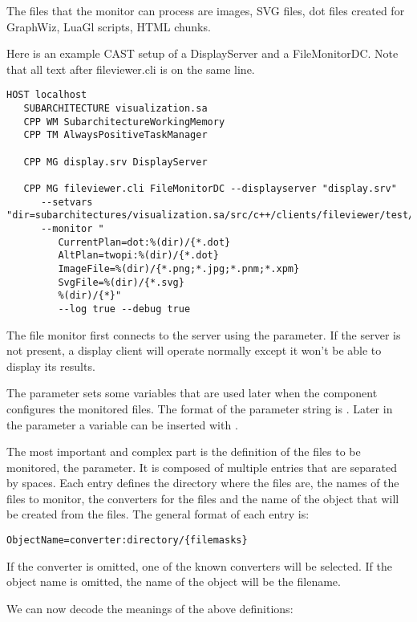 The files that the monitor can process are images, SVG files, dot files created
for GraphWiz, LuaGl scripts, HTML chunks.

Here is an example CAST setup of a DisplayServer and a FileMonitorDC. Note that
all text after fileviewer.cli is on the same line.

\begin{Verbatim}[fontsize=\scriptsize,gobble=3]
   HOST localhost
   SUBARCHITECTURE visualization.sa 
   CPP WM SubarchitectureWorkingMemory
   CPP TM AlwaysPositiveTaskManager

   CPP MG display.srv DisplayServer

   CPP MG fileviewer.cli FileMonitorDC --displayserver "display.srv"
      --setvars "dir=subarchitectures/visualization.sa/src/c++/clients/fileviewer/test/xdata"
      --monitor "
         CurrentPlan=dot:%(dir)/{*.dot}
         AltPlan=twopi:%(dir)/{*.dot}
         ImageFile=%(dir)/{*.png;*.jpg;*.pnm;*.xpm}
         SvgFile=%(dir)/{*.svg}
         %(dir)/{*}"
         --log true --debug true
\end{Verbatim}

The file monitor first connects to the server using the 
parameter. If the server is not present, a display client will operate normally
except it won't be able to display its results.

The parameter  sets some variables that are used later when
the component configures the monitored files. The format of the parameter
string is . Later in the parameter
 a variable can be inserted with .

The most important and complex part is the definition of the files to be
monitored, the  parameter. It is composed of multiple entries
that are separated by spaces. Each entry defines the directory where the files
are, the names of the files to monitor, the converters for the files and the
name of the object that will be created from the files. The general format of
each entry is:
\begin{Verbatim}[fontsize=\scriptsize,gobble=3]
   ObjectName=converter:directory/{filemasks}
\end{Verbatim}

If the converter is omitted, one of the known converters will be selected.
If the object name is omitted, the name of the object will be the filename.

We can now decode the meanings of the above definitions:

